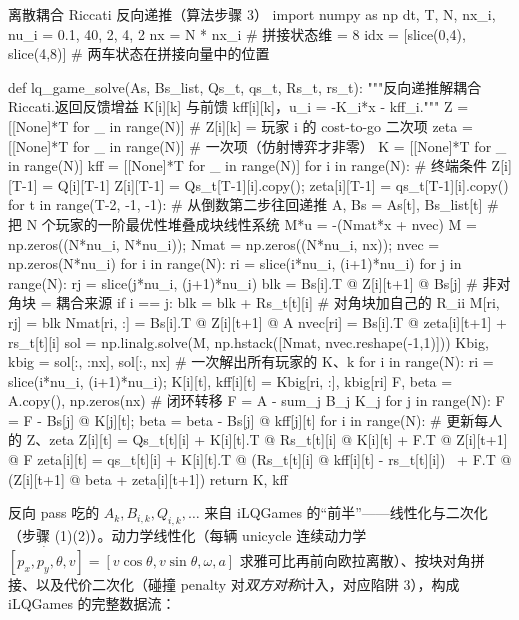 \begin{codebox}[Python]{离散耦合 Riccati 反向递推（算法步骤 3）}
import numpy as np
dt, T, N, nx_i, nu_i = 0.1, 40, 2, 4, 2
nx = N * nx_i                                  # 拼接状态维 = 8
idx = [slice(0,4), slice(4,8)]                 # 两车状态在拼接向量中的位置

def lq_game_solve(As, Bs_list, Qs_t, qs_t, Rs_t, rs_t):
    """反向递推解耦合 Riccati.返回反馈增益 K[i][k] 与前馈 kff[i][k]，u_i = -K_i*x - kff_i."""
    Z    = [[None]*T for _ in range(N)]        # Z[i][k] = 玩家 i 的 cost-to-go 二次项
    zeta = [[None]*T for _ in range(N)]        # 一次项（仿射博弈才非零）
    K    = [[None]*T for _ in range(N)]
    kff  = [[None]*T for _ in range(N)]
    for i in range(N):                          # 终端条件 Z[i][T-1] = Q[i][T-1]
        Z[i][T-1] = Qs_t[T-1][i].copy(); zeta[i][T-1] = qs_t[T-1][i].copy()
    for t in range(T-2, -1, -1):                # 从倒数第二步往回递推
        A, Bs = As[t], Bs_list[t]
        # 把 N 个玩家的一阶最优性堆叠成块线性系统 M*u = -(Nmat*x + nvec)
        M    = np.zeros((N*nu_i, N*nu_i)); Nmat = np.zeros((N*nu_i, nx)); nvec = np.zeros(N*nu_i)
        for i in range(N):
            ri = slice(i*nu_i, (i+1)*nu_i)
            for j in range(N):
                rj  = slice(j*nu_i, (j+1)*nu_i)
                blk = Bs[i].T @ Z[i][t+1] @ Bs[j]      # 非对角块 = 耦合来源
                if i == j: blk = blk + Rs_t[t][i]      # 对角块加自己的 R_ii
                M[ri, rj] = blk
            Nmat[ri, :] = Bs[i].T @ Z[i][t+1] @ A
            nvec[ri]    = Bs[i].T @ zeta[i][t+1] + rs_t[t][i]
        sol  = np.linalg.solve(M, np.hstack([Nmat, nvec.reshape(-1,1)]))
        Kbig, kbig = sol[:, :nx], sol[:, nx]            # 一次解出所有玩家的 K、k
        for i in range(N):
            ri = slice(i*nu_i, (i+1)*nu_i); K[i][t], kff[i][t] = Kbig[ri, :], kbig[ri]
        F, beta = A.copy(), np.zeros(nx)                # 闭环转移 F = A - sum_j B_j K_j
        for j in range(N):
            F = F - Bs[j] @ K[j][t]; beta = beta - Bs[j] @ kff[j][t]
        for i in range(N):                              # 更新每人的 Z、zeta
            Z[i][t]    = Qs_t[t][i] + K[i][t].T @ Rs_t[t][i] @ K[i][t] + F.T @ Z[i][t+1] @ F
            zeta[i][t] = qs_t[t][i] + K[i][t].T @ (Rs_t[t][i] @ kff[i][t] - rs_t[t][i]) \
                         + F.T @ (Z[i][t+1] @ beta + zeta[i][t+1])
    return K, kff
\end{codebox}

\noindent 反向 pass 吃的 $A_k,B_{i,k},Q_{i,k},\dots$ 来自 iLQGames 的“前半”——线性化与二次化（步骤 (1)(2)）。动力学线性化（每辆 unicycle 连续动力学 $\dot{[p_x,p_y,\theta,v]}=[v\cos\theta,v\sin\theta,\omega,a]$ 求雅可比再前向欧拉离散）、按块对角拼接、以及代价二次化（碰撞 penalty 对\emph{双方对称}计入，对应陷阱 3），构成 iLQGames 的完整数据流：

